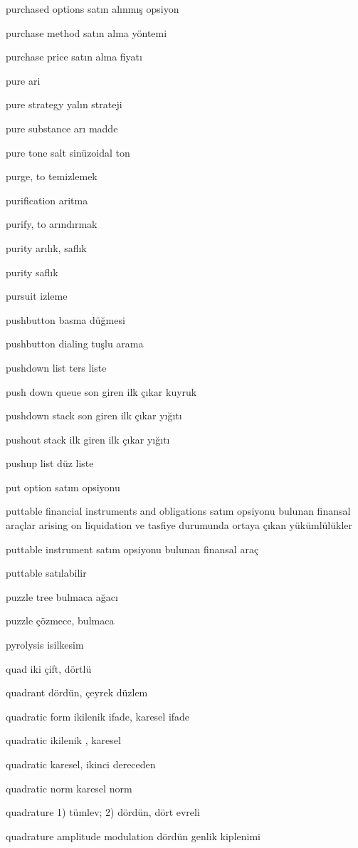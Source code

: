 \documentclass[12pt,fleqn]{article}\usepackage{../../common}
\begin{document}
purchased options satın alınmış opsiyon

purchase method satın alma yöntemi

purchase price satın alma fiyatı

pure ari

pure strategy yalın strateji

pure substance arı madde

pure tone salt sinüzoidal ton

purge, to temizlemek

purification aritma

purify, to arındırmak

purity arılık, saflık

purity saflık

pursuit izleme

pushbutton basma düğmesi

pushbutton dialing tuşlu arama

pushdown list ters liste

push down queue son giren ilk çıkar kuyruk

pushdown stack son giren ilk çıkar yığıtı

pushout stack ilk giren ilk çıkar yığıtı

pushup list düz liste

put option satım opsiyonu

puttable financial instruments and obligations satım opsiyonu bulunan finansal araçlar arising on liquidation ve tasfiye durumunda ortaya çıkan yükümlülükler

puttable instrument satım opsiyonu bulunan finansal araç

puttable satılabilir

puzzle tree bulmaca ağacı

puzzle çözmece, bulmaca

pyrolysis isilkesim

quad iki çift, dörtlü

quadrant dördün, çeyrek düzlem

quadratic form ikilenik ifade, karesel ifade

quadratic ikilenik , karesel

quadratic karesel, ikinci dereceden

quadratic norm karesel norm

quadrature 1) tümlev; 2) dördün, dört evreli

quadrature amplitude modulation dördün genlik kiplenimi
\end{document}
